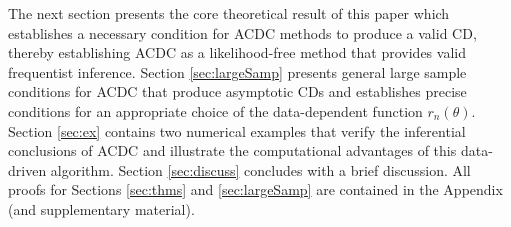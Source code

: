 The next section presents the core theoretical result of this paper %
which establishes a necessary condition for ACDC methods to produce a valid CD, thereby %
establishing ACDC as a likelihood-free method that provides valid frequentist inference. 
Section \ref{sec:largeSamp} presents general large sample conditions for ACDC that produce asymptotic CDs and establishes precise conditions for an appropriate choice of the data-dependent function $r_n(\theta)$. Section \ref{sec:ex} contains two numerical examples that verify the inferential conclusions of ACDC and illustrate the computational advantages of this data-driven algorithm. Section \ref{sec:discuss} concludes with a brief discussion. All proofs for Sections \ref{sec:thms} and \ref{sec:largeSamp} are contained in the Appendix (and supplementary material). 


